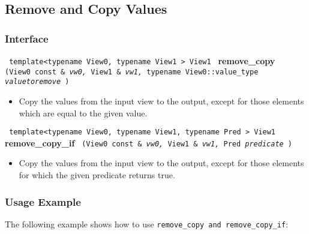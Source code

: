  
\subsection{Remove and Copy Values} \label{sec-remv-copy_if}

\subsubsection{Interface} %

\noindent
\texttt{%
template<typename View0, typename View1 >
\newline
View1 
}
\newline
\textbf{remove\_copy}%
\texttt{%
(View0 const \&
\textit{vw0,}%
View1 \&
\textit{vw1,}%
typename View0::value\_type 
\textit{valuetoremove}%
)
}

\begin{itemize}
\item
Copy the values from the input view to the output, except for those elements which are equal to the given value. 
\end{itemize}

\noindent
\texttt{%
template<typename View0, typename View1, typename Pred >
\newline
View1 
}
\newline
\textbf{remove\_copy\_if}%
\texttt{%
(View0 const \&
\textit{vw0,}%
View1 \&
\textit{vw1,}%
Pred 
\textit{predicate}%
)
}

\begin{itemize}
\item
Copy the values from the input view to the output, except for those elements for which the given predicate returns true. 
\end{itemize}
 
\subsubsection{Usage Example} %

The following example shows how to use \texttt{remove\_copy and remove\_copy\_if}:

 
